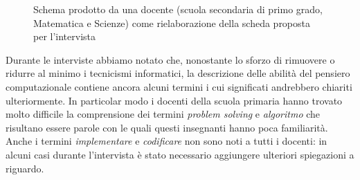 \documentclass[12pt]{report}
\begin{document}
\begin{figure}[htb]
	\centering
	\caption{Schema prodotto da una docente (scuola secondaria di primo grado, Matematica e Scienze) come rielaborazione della scheda proposta per l'intervista}\label{rielaborazioneCT}
\end{figure}


	
Durante le interviste abbiamo notato che, nonostante lo sforzo di rimuovere o ridurre al minimo i tecnicismi informatici, la descrizione delle abilità del pensiero computazionale contiene ancora alcuni termini i cui significati andrebbero chiariti ulteriormente. 
In particolar modo i docenti della scuola primaria hanno trovato molto difficile la comprensione dei termini \textit{problem solving} e \textit{algoritmo} che risultano essere parole con le quali questi insegnanti hanno poca familiarità. 
Anche i termini \textit{implementare} e \textit{codificare} non sono noti a tutti i docenti: in alcuni casi durante l'intervista è stato necessario aggiungere ulteriori spiegazioni a riguardo.
\end{document}
